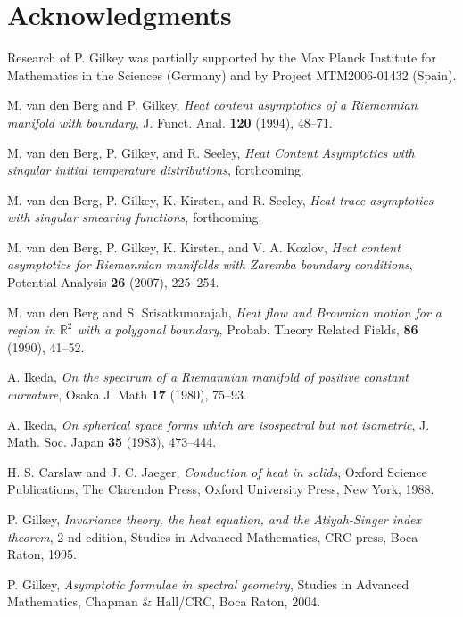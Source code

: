 \documentclass{amsart}
\begin{document}
\section*{Acknowledgments}Research of P. Gilkey was partially
supported by the Max Planck Institute for Mathematics in the Sciences (Germany) and by Project MTM2006-01432 (Spain).


\begin{thebibliography}{AA}

 M. van den Berg and P. Gilkey,
\textit{Heat content asymptotics of a Riemannian manifold with boundary},
{J. Funct. Anal.} \textbf{120} (1994), 48--71.

  M. van den Berg, P. Gilkey, and R. Seeley,
\textit{Heat Content Asymptotics with singular initial temperature distributions}, forthcoming.

 M. van den Berg, P. Gilkey, K. Kirsten, and R. Seeley,
\textit{Heat trace asymptotics with singular smearing functions},
forthcoming.

 M. van den Berg, P. Gilkey, K. Kirsten, and V. A. Kozlov,
\textit{Heat content asymptotics for Riemannian manifolds with Zaremba boundary conditions},
Potential Analysis \textbf{26} (2007), 225--254.

 M. van den Berg and S. Srisatkunarajah,
\textit{Heat flow and Brownian motion for a region
in $\mathbb{R}^2$ with a polygonal boundary},
Probab. Theory Related Fields, \textbf{86} (1990), 41--52.

 A. Ikeda,
\textit{On the spectrum of a Riemannian manifold of positive constant curvature},
Osaka J. Math \textbf{17} (1980), 75--93.

 A. Ikeda,
\textit{On spherical space forms which are isospectral but not isometric},
J. Math. Soc. Japan \textbf{35} (1983), 473--444.

 H. S. Carslaw and J. C. Jaeger,
\textit{Conduction of heat in solids}, Oxford Science Publications,
The Clarendon Press, Oxford University Press, New York, 1988.

 P. Gilkey,
\textit{Invariance theory, the heat equation, and the Atiyah-Singer
index theorem}, 2-nd edition, Studies in Advanced Mathematics, CRC
press, Boca Raton, 1995.

 P. Gilkey,
\textit{Asymptotic formulae in spectral geometry}, Studies in
Advanced Mathematics, Chapman \& Hall/CRC, Boca Raton, 2004.


\end{thebibliography}
\end{document}
